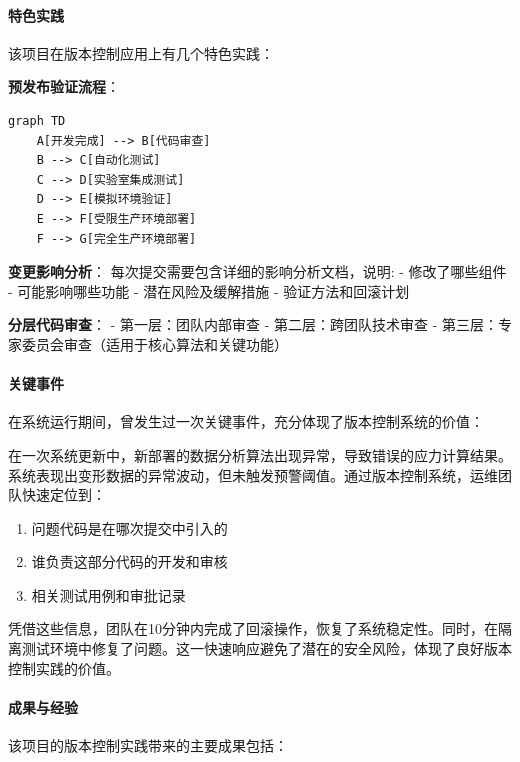 \paragraph{特色实践}\label{ux7279ux8272ux5b9eux8df5}

该项目在版本控制应用上有几个特色实践：

\textbf{预发布验证流程}：

\begin{lstlisting}
graph TD
    A[开发完成] --> B[代码审查]
    B --> C[自动化测试]
    C --> D[实验室集成测试]
    D --> E[模拟环境验证]
    E --> F[受限生产环境部署]
    F --> G[完全生产环境部署]
\end{lstlisting}

\textbf{变更影响分析}： 每次提交需要包含详细的影响分析文档，说明: -
修改了哪些组件 - 可能影响哪些功能 - 潜在风险及缓解措施 -
验证方法和回滚计划

\textbf{分层代码审查}： - 第一层：团队内部审查 - 第二层：跨团队技术审查
- 第三层：专家委员会审查（适用于核心算法和关键功能）

\paragraph{关键事件}\label{ux5173ux952eux4e8bux4ef6}

在系统运行期间，曾发生过一次关键事件，充分体现了版本控制系统的价值：

在一次系统更新中，新部署的数据分析算法出现异常，导致错误的应力计算结果。系统表现出变形数据的异常波动，但未触发预警阈值。通过版本控制系统，运维团队快速定位到：

\begin{enumerate}
\def\labelenumi{\arabic{enumi}.}
\tightlist
\item
  问题代码是在哪次提交中引入的
\item
  谁负责这部分代码的开发和审核
\item
  相关测试用例和审批记录
\end{enumerate}

凭借这些信息，团队在10分钟内完成了回滚操作，恢复了系统稳定性。同时，在隔离测试环境中修复了问题。这一快速响应避免了潜在的安全风险，体现了良好版本控制实践的价值。

\paragraph{成果与经验}\label{ux6210ux679cux4e0eux7ecfux9a8c}

该项目的版本控制实践带来的主要成果包括：

